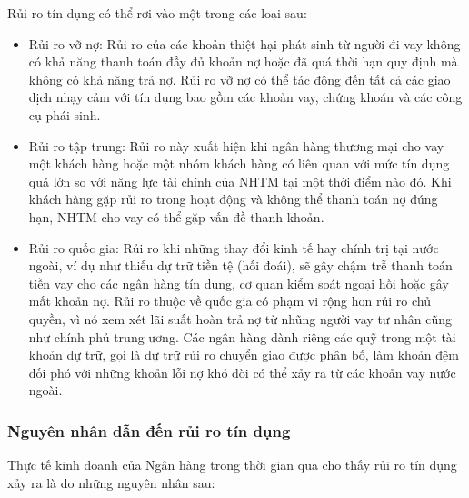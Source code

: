 Rủi ro tín dụng có thể rơi vào một trong các loại sau:
\begin{itemize}
\item Rủi ro vỡ nợ: Rủi ro của các khoản thiệt hại phát sinh từ người đi vay không có khả năng thanh toán đầy đủ khoản nợ hoặc đã quá thời hạn quy định mà không có khả năng trả nợ. Rủi ro vỡ nợ có thể tác động đến tất cả các giao dịch nhạy cảm với tín dụng bao gồm các khoản vay, chứng khoán và các công cụ phái sinh.
\item Rủi ro tập trung: Rủi ro này xuất hiện khi ngân hàng thương mại cho vay một khách hàng hoặc một nhóm khách hàng có liên quan với mức tín dụng quá lớn so với năng lực tài chính của NHTM tại một thời điểm nào đó. Khi khách hàng gặp rủi ro trong hoạt động và không thể thanh toán nợ đúng hạn, NHTM cho vay có thể gặp vấn đề thanh khoản.
\item Rủi ro quốc gia: Rủi ro khi những thay đổi kinh tế hay chính trị tại nước ngoài, ví dụ như thiếu dự trữ tiền tệ (hối đoái), sẽ gây chậm trễ thanh toán tiền vay cho các  ngân hàng tín dụng, cơ quan kiểm soát ngoại hối hoặc gây mất khoản nợ. Rủi ro thuộc về quốc gia có phạm vi rộng hơn rủi ro chủ quyền, vì nó xem xét lãi suất hoàn trả nợ từ nhũng người vay tư nhân cũng như chính phủ trung ương. Các ngân hàng dành riêng các quỹ trong một tài khoản dự trữ, gọi là dự trữ rủi ro chuyển giao được phân bố, làm khoản đệm đối phó với những khoản lỗi nợ khó đòi có thể xảy ra từ các khoản vay nước ngoài.
\end{itemize}

\subsubsection{Nguyên nhân dẫn đến rủi ro tín dụng}
Thực tế kinh doanh của Ngân hàng trong thời gian qua cho thấy rủi ro tín dụng xảy ra là do những nguyên nhân sau:

